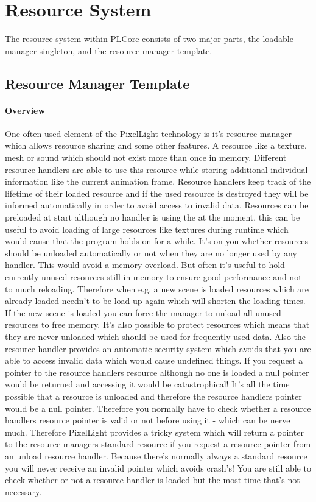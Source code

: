 \section{Resource System}
The resource system within PLCore consists of two major parts, the loadable manager singleton, and the resource manager template.




\subsection{Resource Manager Template}


\paragraph{Overview}
One often used element of the PixelLight technology is it's resource manager which allows resource sharing and some other features. A resource like a texture, mesh or sound which should not exist more than once in memory. Different resource handlers are able to use this resource while storing additional individual information like the current animation frame. Resource handlers keep track of the lifetime of their loaded resource and if the used resource is destroyed they will be informed automatically in order to avoid access to invalid data. Resources can be preloaded at start although no handler is using the at the moment, this can be useful to avoid loading of large resources like textures during runtime which would cause that the program holds on for a while. It's on you whether resources should be unloaded automatically or not when they are no longer used by any handler. This would avoid a memory overload. But often it's useful to hold currently unused resources still in memory to ensure good performance and not to much reloading. Therefore when e.g. a new scene is loaded resources which are already loaded needn't to be load up again which will shorten the loading times. If the new scene is loaded you can force the manager to unload all unused resources to free memory. It's also possible to protect resources which means that they are never unloaded which should be used for frequently used data. Also the resource handler provides an automatic security system which avoids that you are able to access invalid data which would cause undefined things. If you request a pointer to the resource handlers resource although no one is loaded a null pointer would be returned and accessing it would be catastrophical! It's all the time possible that a resource is unloaded and therefore the resource handlers pointer would be a null pointer. Therefore you normally have to check whether a resource handlers resource pointer is valid or not before using it - which can be nerve much. Therefore PixelLight provides a tricky system which will return a pointer to the resource managers standard resource if you request a resource pointer from an unload resource handler. Because there's normally always a standard resource you will never receive an invalid pointer which avoids crash's! You are still able to check whether or not a resource handler is loaded but the most time that's not necessary.

